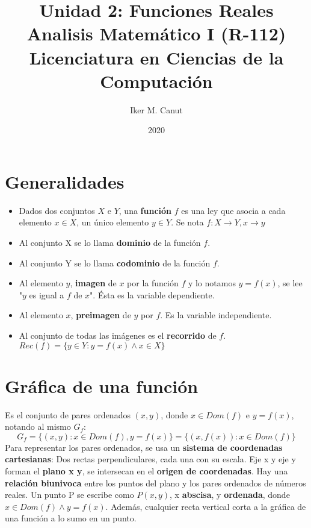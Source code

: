 \documentclass[11pt,a4paper]{article}
\author{Iker M. Canut}
\title{Unidad 2: Funciones Reales\\ Analisis Matem\'atico I (R-112)\\Licenciatura en Ciencias de la Computaci\'on}
\date{2020}
\begin{document}
\maketitle
\newpage

\section{Generalidades}
\begin{itemize}
\item Dados dos conjuntos $X$ e $Y$, una \textbf{funci\'on} $f$ es una ley que asocia a cada elemento $x \in X$, un \'unico elemento $y \in Y$. Se nota $f : X \rightarrow Y, x \rightarrow y$
\item Al conjunto X se lo llama \textbf{dominio} de la funci\'on $f$.
\item Al conjunto Y se lo llama \textbf{codominio} de la funci\'on $f$.
\item Al elemento $y$, \textbf{imagen} de $x$ por la funci\'on $f$ y lo notamos $y = f(x)$, se lee "$y$ es igual a $f$ de $x$". \'Esta es la variable dependiente.
\item Al elemento $x$, \textbf{preimagen} de $y$ por $f$. Es la variable independiente.
\item Al conjunto de todas las im\'agenes es el \textbf{recorrido} de $f$. $Rec(f) = \{ y \in Y : y = f(x) \land x \in X \}$
\end{itemize}

\section{Gr\'afica de una funci\'on}
Es el conjunto de pares ordenados $(x,y)$, donde $x \in Dom(f)$ e $y = f(x)$, notando al mismo $G_f$:
$$G_f = \{ (x,y) : x \in Dom(f), y = f(x) \} = \{ (x, f(x)) : x \in Dom(f) \}$$
Para representar los pares ordenados, se usa un \textbf{sistema de coordenadas cartesianas}: Dos rectas perpendiculares, cada una con su escala. Eje x y eje y forman el \textbf{plano x y}, se intersecan en el \textbf{origen de coordenadas}. Hay una \textbf{relaci\'on biunivoca} entre los puntos del plano y los pares ordenados de n\'umeros reales. Un punto P se escribe como $P(x,y)$, x \textbf{abscisa}, y \textbf{ordenada}, donde $x \in Dom(f) \land y = f(x)$. Adem\'as, cualquier recta vertical corta a la gr\'afica de una funci\'on a lo sumo en un punto.
\end{document}
